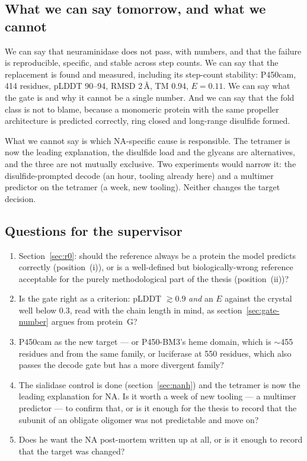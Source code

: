 \documentclass[11pt,a4paper]{article}
\begin{document}
\subsection{What we can say tomorrow, and what we cannot}

We can say that neuraminidase does not pass, with numbers, and that the failure
is reproducible, specific, and stable across step counts. We can say that the
replacement is found and measured, including its step-count stability: P450cam,
414 residues, pLDDT 90--94, RMSD 2\,\AA, TM 0.94, $E = 0.11$. We can say what the
gate is and why it cannot be a single number. And we can say that the fold class
is not to blame, because a monomeric protein with the same propeller architecture
is predicted correctly, ring closed and long-range disulfide formed.

What we cannot say is which NA-specific cause is responsible. The tetramer is now
the leading explanation, the disulfide load and the glycans are alternatives, and
the three are not mutually exclusive. Two experiments would narrow it: the
disulfide-prompted decode (an hour, tooling already here) and a multimer
predictor on the tetramer (a week, new tooling). Neither changes the target
decision.

\subsection{Questions for the supervisor}

\begin{enumerate}
  \item Section~\ref{sec:r0}: should the reference always be a protein the model
        predicts correctly (position~(i)), or is a well-defined but
        biologically-wrong reference acceptable for the purely methodological
        part of the thesis (position~(ii))?
  \item Is the gate right as a criterion: pLDDT $\gtrsim0.9$ \emph{and} an $E$
        against the crystal well below 0.3, read with the chain length in mind,
        as section~\ref{sec:gate-number} argues from protein~G?
  \item P450cam as the new target --- or P450-BM3's heme domain, which is
        $\sim$455 residues and from the same family, or luciferase at 550
        residues, which also passes the decode gate but has a more divergent
        family?
  \item The sialidase control is done (section~\ref{sec:nanh}) and the tetramer
        is now the leading explanation for NA. Is it worth a week of new tooling
        --- a multimer predictor --- to confirm that, or is it enough for the
        thesis to record that the subunit of an obligate oligomer was not
        predictable and move on?
  \item Does he want the NA post-mortem written up at all, or is it enough to
        record that the target was changed?
\end{enumerate}
\end{document}
